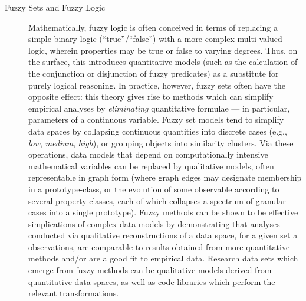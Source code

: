\documentclass[11pt,letterpaper]{article}
\newcommand{\q}[1]{{\fontfamily{qcr}\selectfont ``}#1{\fontfamily{qcr}\selectfont ''}}
\begin{document}
{{\begin{description}
\item[Fuzzy Sets and Fuzzy Logic]  Mathematically, 
fuzzy logic is often conceived in terms of replacing a 
simple binary logic (\q{true}/\q{false}) with a 
more complex multi-valued logic, wherein properties 
may be true or false to varying degrees.  Thus, on the 
surface, this introduces quantitative models 
(such as the calculation of the conjunction or disjunction 
of fuzzy predicates) as a substitute for purely 
logical reasoning.  In practice, however, fuzzy 
sets often have the opposite effect: this theory 
gives rise to methods which can simplify empirical 
analyses by \textit{eliminating} quantitative 
formulae --- in particular, parameters of a continuous 
variable.  Fuzzy set models tend to simplify data 
spaces by collapsing continuous quantities into discrete 
cases (e.g., \textit{low}, \textit{medium}, \textit{high}), 
or grouping objects into similarity clusters.  
Via these operations, data models that depend on 
computationally intensive mathematical variables 
can be replaced by qualitative models, often 
representable in graph form (where graph edges 
may designate membership in a prototype-class, 
or the evolution of some observable according to 
several property classes, each of which 
collapses a spectrum of granular cases into a single 
prototype).  Fuzzy methods can be shown to be 
effective simplications of complex data models 
by demonstrating that analyses conducted via 
qualitative reconstructions of a data space, 
for a given set a observations, 
are comparable to results obtained from more 
quantitative methods and/or are a good fit to 
empirical data.  Research data sets which emerge 
from fuzzy methods can be qualitative models 
derived from quantitative data spaces, as 
well as code libraries which perform the relevant 
transformations.


\end{description}}}
\end{document}
